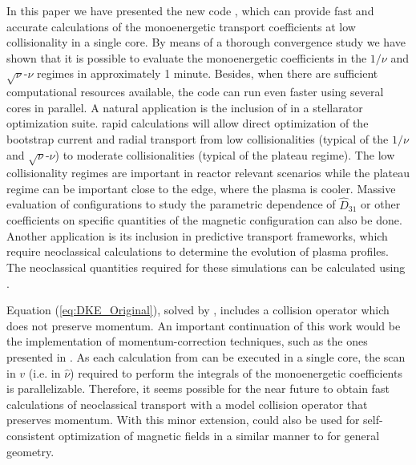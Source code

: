 In this paper we have presented the new code {\MONKES}, which can provide fast and accurate calculations of the monoenergetic transport coefficients at low collisionality in a single core. By means of a thorough convergence study we have shown that it is possible to evaluate the monoenergetic coefficients in the $1/\nu$ and $\sqrt{\nu}$-$\nu$ regimes in approximately 1 minute. Besides, when there are sufficient computational resources available, the code can run even faster using several cores in parallel. A natural application is the inclusion of {\MONKES} in a stellarator optimization suite. {\MONKES} rapid calculations will allow direct optimization of the bootstrap current and radial transport from low collisionalities (typical of the $1/\nu$ and $\sqrt{\nu}$-$\nu$) to moderate collisionalities (typical of the plateau regime). The low collisionality regimes are important in reactor relevant scenarios while the plateau regime can be important close to the edge, where the plasma is cooler. Massive evaluation of configurations to study the parametric dependence of $\widehat{D}_{31}$ or other coefficients on specific quantities of the magnetic configuration can also be done. Another application is its inclusion in predictive transport frameworks, which require neoclassical calculations to determine the evolution of plasma profiles. The neoclassical quantities required for these simulations can be calculated using {\MONKES}.


Equation (\ref{eq:DKE_Original}), solved by {\MONKES}, includes a collision operator which does not preserve momentum. An important continuation of this work would be the implementation of momentum-correction techniques, such as the ones presented in \cite{Taguchi,Sugama-PENTA,Sugama2008,MaasbergMomentumCorrection}. As each calculation from {\MONKES} can be executed in a single core, the scan in $v$ (i.e. in $\hat{\nu}$) required to perform the integrals of the monoenergetic coefficients is parallelizable. Therefore, it seems possible for the near future to obtain fast calculations of neoclassical transport with a model collision operator that preserves momentum. With this minor extension, {\MONKES} could also be used for self-consistent optimization of magnetic fields in a similar manner to \cite{Landreman_SelfConsistent} for general geometry. 
 

 





